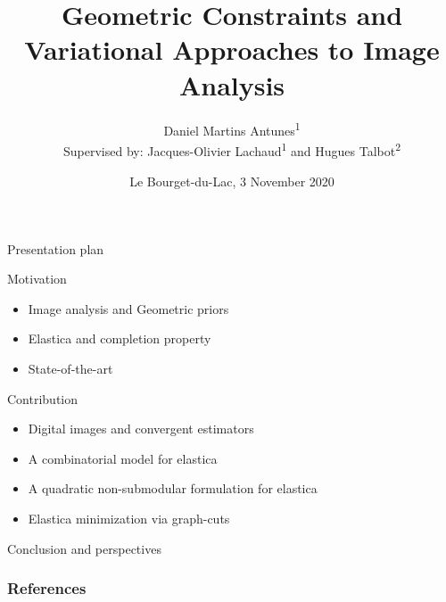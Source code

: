 \documentclass[10pt,xcolor=svgnames]{beamer}
\title
  [Geometric Constraints and Variational Approaches to Image Analysis]
  {Geometric Constraints and Variational Approaches to Image Analysis}
\author[Daniel Martins Antunes]{  
  {Daniel Martins Antunes\textsuperscript{1}\\[1em]
  Supervised by: Jacques-Olivier Lachaud\textsuperscript{1} and Hugues Talbot\textsuperscript{2}}
}
\date
  {Le Bourget-du-Lac, 3 November 2020}
\institute
  {
	\textsuperscript{1}LAMA, Université Savoie Mont Blanc \\ 
	\textsuperscript{2}CentraleSupélec, Université Paris-Saclay
  }
\begin{document}
  \maketitle
  \captionsetup[subfigure]{labelformat=empty}

\begin{frame}
	{Presentation plan}

\begin{enumerate}
	{
	\item{Motivation}
	\begin{itemize}
		\item{Image analysis and Geometric priors}
		\item{Elastica and completion property}		
		\item{State-of-the-art}							
	\end{itemize}}
	\vspace{1em}
	\item{Contribution}
	\begin{itemize}
		\item{Digital images and convergent estimators}		
		\item{A combinatorial model for elastica}
		\item{A quadratic non-submodular formulation for elastica}	
		\item{Elastica minimization via graph-cuts}	
	\end{itemize}
	\vspace{1em}
	\item{Conclusion and perspectives}
\end{enumerate}

\end{frame}









\begin{frame}[allowframebreaks]
    \frametitle{References}	
    \printbibliography
\end{frame}
\end{document}
